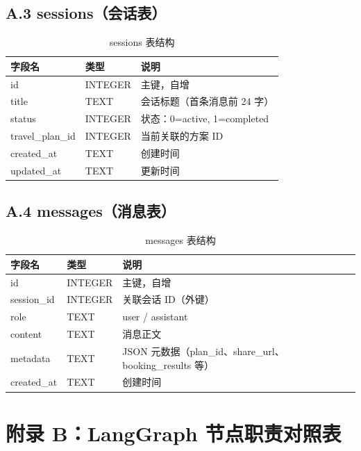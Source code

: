 \documentclass[12pt,a4paper]{ctexart}
\begin{document}
\subsection*{A.3 sessions（会话表）}

\begin{table}[ht]
\centering
\begin{tabular}{p{3cm}p{2cm}p{8cm}}
\toprule
\textbf{字段名} & \textbf{类型} & \textbf{说明} \\
\midrule
id            & INTEGER  & 主键，自增 \\
title         & TEXT     & 会话标题（首条消息前 24 字） \\
status        & INTEGER  & 状态：0=active, 1=completed \\
travel\_plan\_id & INTEGER & 当前关联的方案 ID \\
created\_at   & TEXT     & 创建时间 \\
updated\_at   & TEXT     & 更新时间 \\
\bottomrule
\end{tabular}
\caption{sessions 表结构}
\end{table}

\subsection*{A.4 messages（消息表）}

\begin{table}[ht]
\centering
\begin{tabular}{p{3cm}p{2cm}p{8cm}}
\toprule
\textbf{字段名} & \textbf{类型} & \textbf{说明} \\
\midrule
id            & INTEGER  & 主键，自增 \\
session\_id   & INTEGER  & 关联会话 ID（外键） \\
role          & TEXT     & user / assistant \\
content       & TEXT     & 消息正文 \\
metadata      & TEXT     & JSON 元数据（plan\_id、share\_url、booking\_results 等） \\
created\_at   & TEXT     & 创建时间 \\
\bottomrule
\end{tabular}
\caption{messages 表结构}
\end{table}

\clearpage

\section*{附录 B：LangGraph 节点职责对照表}
\end{document}
